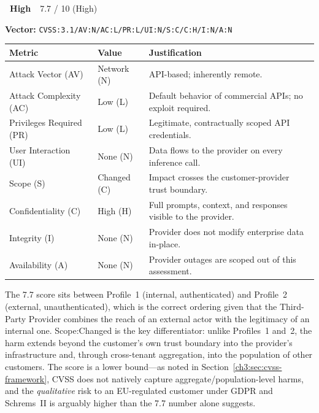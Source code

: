 \documentclass[11pt,a4paper]{report}
\newcommand{\badgehigh}{\colorbox{warn}{\color{white}\small\textbf{~High~}}}
\newcommand{\cvssvec}[1]{\texttt{\small #1}}
\begin{document}
\begin{cvssbox}{\badgehigh\ 7.7 / 10 (High)}
\vspace{2pt}
\begin{center}
\textbf{Vector:}\enspace
\cvssvec{CVSS:3.1/AV:N/AC:L/PR:L/UI:N/S:C/C:H/I:N/A:N}
\end{center}
\vspace{8pt}
\begin{tabular}{W{3.4cm}W{2.2cm}W{7.8cm}}
\toprule
  
  \small\textbf{Metric} &
  \small\textbf{Value} &
  \small\textbf{Justification} \\
  \midrule
  
  \small Attack Vector (AV)     & \small Network (N) & \small API-based; inherently remote. \\
  
  \small Attack Complexity (AC) & \small Low (L)     & \small Default behavior of commercial APIs; no exploit required. \\
  
  \small Privileges Required (PR)  & \small Low (L)  & \small Legitimate, contractually scoped API credentials. \\
  
  \small User Interaction (UI)  & \small None (N)    & \small Data flows to the provider on every inference call. \\
  
  \small Scope (S)              & \small Changed (C) & \small Impact crosses the customer-provider trust boundary. \\
  
  \small Confidentiality (C)    & \small High (H)    & \small Full prompts, context, and responses visible to the provider. \\
  
  \small Integrity (I)          & \small None (N)    & \small Provider does not modify enterprise data in-place. \\
  
  \small Availability (A)       & \small None (N)    & \small Provider outages are scoped out of this assessment. \\
  \bottomrule
\end{tabular}
\vspace{6pt}

\small The 7.7 score sits between Profile~1 (internal, authenticated) and
Profile~2 (external, unauthenticated), which is the correct ordering
given that the Third-Party Provider combines the reach of an external
actor with the legitimacy of an internal one. Scope:Changed is the key
differentiator: unlike Profiles~1 and~2, the harm extends beyond the
customer's own trust boundary into the provider's infrastructure and,
through cross-tenant aggregation, into the population of other customers.
The score is a lower bound---as noted in Section~\ref{ch3:sec:cvss-framework},
CVSS does not natively capture aggregate/population-level harms, and the
\emph{qualitative} risk to an EU-regulated customer under GDPR and
Schrems~II is arguably higher than the 7.7 number alone suggests.
\end{cvssbox}
\end{document}
